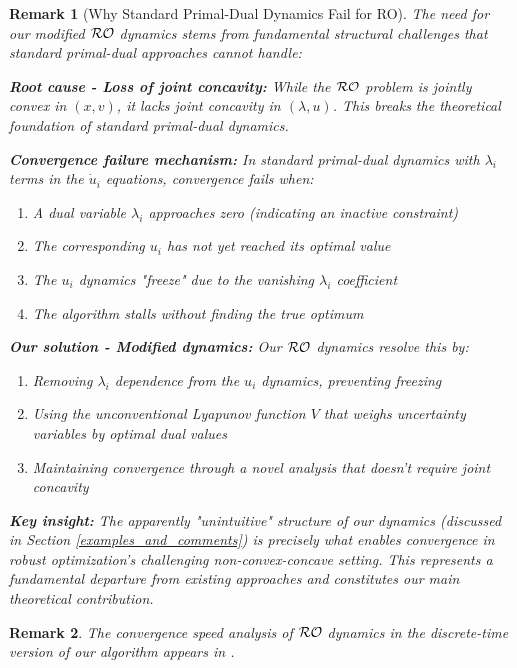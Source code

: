 \documentclass[journal,twoside,web]{ieeecolor}
\newtheorem{remark}{Remark}
\begin{document}
{\color{blue} \begin{remark}[Why Standard Primal-Dual Dynamics Fail for RO] \label{remark_reader_notice}
The need for our modified ${\cal RO}$ dynamics stems from fundamental structural challenges that standard primal-dual approaches cannot handle:

\textbf{Root cause - Loss of joint concavity:} While the ${\cal RO}$ problem is jointly convex in $(x, v)$, it lacks joint concavity in $(\lambda, u)$. This breaks the theoretical foundation of standard primal-dual dynamics.

\textbf{Convergence failure mechanism:} In standard primal-dual dynamics with $\lambda_i$ terms in the $\dot{u}_i$ equations, convergence fails when:
\begin{enumerate}
\item A dual variable $\lambda_i$ approaches zero (indicating an inactive constraint)
\item The corresponding $u_i$ has not yet reached its optimal value
\item The $u_i$ dynamics "freeze" due to the vanishing $\lambda_i$ coefficient
\item The algorithm stalls without finding the true optimum
\end{enumerate}

\textbf{Our solution - Modified dynamics:} Our ${\cal RO}$ dynamics resolve this by:
\begin{enumerate}
\item Removing $\lambda_i$ dependence from the $u_i$ dynamics, preventing freezing
\item Using the unconventional Lyapunov function $V$ that weighs uncertainty variables by optimal dual values
\item Maintaining convergence through a novel analysis that doesn't require joint concavity
\end{enumerate}

\textbf{Key insight:} The apparently "unintuitive" structure of our dynamics (discussed in Section \ref{examples_and_comments}) is precisely what enables convergence in robust optimization's challenging non-convex-concave setting. This represents a fundamental departure from existing approaches and constitutes our main theoretical contribution.
\end{remark}}

\begin{remark} \label{convergence_speed}
The convergence speed analysis of ${\cal RO}$ dynamics in the discrete-time version of our algorithm appears in \cite{ebrahimi2019cdc}.
\end{remark}
\end{document}
